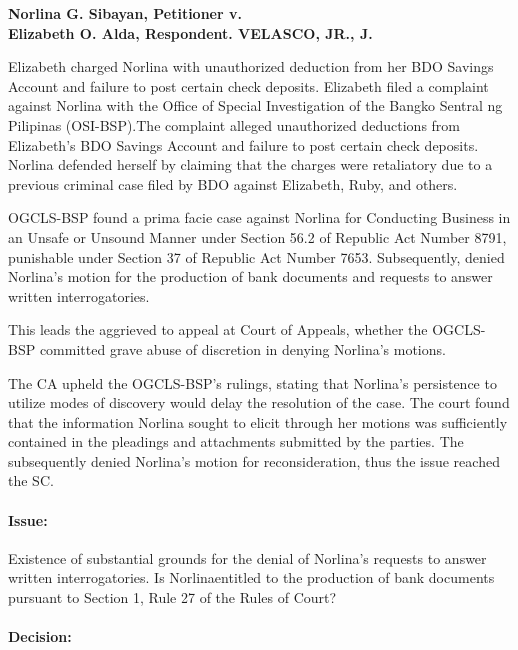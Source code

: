 \documentclass[
12pt,
oneside,
onehalfspacing,
headsepline
]{DigestCollection}
\begin{document}
\label{22575d00-0a10-11ef-932c-63c852f65e48}


\noindent\textbf{Norlina G. Sibayan, Petitioner v. \\Elizabeth O. Alda, Respondent. VELASCO, JR., J.}\vspace{0.4cm}

Elizabeth charged Norlina with unauthorized deduction from her BDO Savings Account and failure to post certain check deposits. Elizabeth filed a complaint against Norlina with the Office of Special Investigation of the Bangko Sentral ng Pilipinas (OSI-BSP).The complaint alleged unauthorized deductions from Elizabeth's BDO Savings Account and failure to post certain check deposits. Norlina defended herself by claiming that the charges were retaliatory due to a previous criminal case filed by BDO against Elizabeth, Ruby, and others.

OGCLS-BSP found a prima facie case against Norlina for Conducting Business in an Unsafe or Unsound Manner under Section 56.2 of Republic Act Number 8791, punishable under Section 37 of Republic Act Number 7653. Subsequently, denied Norlina's motion for the production of bank documents and requests to answer written interrogatories.

This leads the aggrieved to appeal at Court of Appeals, whether the OGCLS-BSP committed grave abuse of discretion in denying Norlina's motions.

The CA upheld the OGCLS-BSP's rulings, stating that Norlina's persistence to utilize modes of discovery would delay the resolution of the case. The court found that the information Norlina sought to elicit through her motions was sufficiently contained in the pleadings and attachments submitted by the parties. The subsequently denied Norlina's motion for reconsideration, thus the issue reached the SC.

\paragraph{Issue:}
\label{03236850-09fe-11ef-932c-63c852f65e48}


Existence of substantial grounds for the denial of Norlina's requests to answer written interrogatories. Is Norlinaentitled to the production of bank documents pursuant to Section 1, Rule 27 of the Rules of Court?

\paragraph{Decision:}
\label{04d97cc0-09fe-11ef-932c-63c852f65e48}
\end{document}
